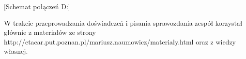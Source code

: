 \documentclass[polish,a4paper]{article}
\begin{document}
[Schemat połączeń D:]




\begin{thebibliography}{9}

  W trakcie przeprowadzania doświadczeń i pisania sprawozdania zespół korzystał głównie z materiałów ze strony http://etacar.put.poznan.pl/mariusz.naumowicz/materialy.html oraz z wiedzy własnej.

\end{thebibliography}
\end{document}
